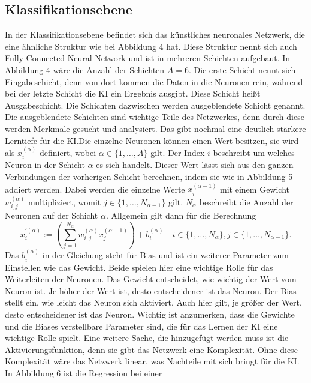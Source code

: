 \documentclass[11pt]{article}
\begin{document}
\subsection{Klassifikationsebene}
In der Klassifikationsebene befindet sich das künstliches neuronales Netzwerk, die eine ähnliche Struktur wie bei Abbildung 4 hat.
Diese Struktur nennt sich auch Fully Connected Neural Network und ist in mehreren Schichten aufgebaut. In Abbildung 4 wäre die Anzahl
der Schichten $A = 6$. Die erste Schicht nennt sich Eingabeschicht, denn von dort kommen die Daten in die Neuronen rein, während bei
der letzte Schicht die KI ein Ergebnis ausgibt. Diese Schicht heißt Ausgabeschicht. Die Schichten dazwischen werden ausgeblendete Schicht genannt.
Die ausgeblendete Schichten sind wichtige Teile des Netzwerkes, denn durch diese werden Merkmale gesucht und analysiert. Das gibt nochmal
eine deutlich stärkere Lerntiefe für die KI.\@ Die einzelne Neuronen können einen Wert besitzen, sie wird als $ x_{i}^{(\alpha)} $ definiert,
wobei $ \alpha \in \{1,\ldots,A\} $ gilt. Der Index $i$ beschreibt um welches Neuron in der Schicht $\alpha$ es sich handelt. Dieser Wert
lässt sich aus den ganzen Verbindungen der vorherigen Schicht berechnen, indem sie wie in Abbildung 5 addiert werden. Dabei werden
die einzelne Werte $ x_{i}^{(\alpha-1)} $ mit einem Gewicht $ w_{i,j}^{(\alpha)} $ multipliziert, womit $ j \in \{1,\ldots,N_{\alpha-1}\} $ gilt.
$ N_{\alpha} $ beschreibt die Anzahl der Neuronen auf der Schicht $\alpha$. Allgemein gilt dann für die Berechnung
\begin{equation}
    x_{i}^{'(\alpha)} := (\sum_{j=1}^{N_{\alpha}} w_{i,j}^{(\alpha)} x_{j}^{(\alpha-1)}) + b_{i}^{(\alpha)} \quad i \in \{1,\ldots,N_{\alpha}\}, j \in \{1,\ldots,N_{\alpha-1}\}.
\end{equation}
Das $ b_{i}^{(\alpha)} $ in der Gleichung steht für Bias und ist ein weiterer Parameter zum Einstellen wie das Gewicht. Beide spielen hier eine wichtige Rolle
für das Weiterleiten der Neuronen. Das Gewicht entscheidet, wie wichtig der Wert vom Neuron ist. Je höher der Wert ist, desto entscheidener
ist das Neuron. Der Bias stellt ein, wie leicht das Neuron sich aktiviert. Auch hier gilt, je größer der Wert, desto entscheidener ist das Neuron.
Wichtig ist anzumerken, dass die Gewichte und die Biases verstellbare Parameter sind, die für das Lernen der KI eine wichtige Rolle
spielt. Eine weitere Sache, die hinzugefügt werden muss ist die Aktivierungsfunktion, denn sie gibt das Netzwerk eine Komplexität.
Ohne diese Komplexität wäre das Netzwerk linear, was Nachteile mit sich bringt für die KI. In Abbildung 6 ist die Regression bei einer
\end{document}

